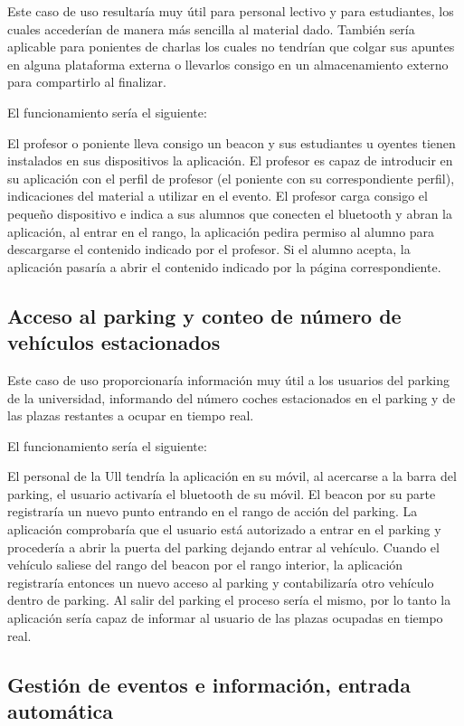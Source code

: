 Este caso de uso resultaría muy útil para personal lectivo y para estudiantes, los cuales accederían de manera más sencilla al material dado. También sería aplicable para ponientes de charlas los cuales no tendrían que colgar sus apuntes en alguna plataforma externa o llevarlos consigo en  un almacenamiento externo para compartirlo al finalizar.

El funcionamiento sería el siguiente: 

El profesor o poniente lleva consigo un beacon y sus estudiantes u oyentes tienen instalados en sus dispositivos la aplicación. El profesor es capaz de introducir en su aplicación con el perfil de profesor (el poniente con su correspondiente perfil), indicaciones del material a utilizar en el evento. El profesor carga consigo el pequeño dispositivo e indica a sus alumnos que conecten el bluetooth y abran la aplicación, al entrar en el rango, la aplicación pedira permiso al alumno para descargarse el contenido indicado por el profesor. Si el alumno acepta, la aplicación pasaría a abrir  el contenido indicado por la página correspondiente.


\subsection{Acceso al parking y conteo de número de vehículos estacionados}


Este caso de uso proporcionaría información muy útil a los usuarios del parking de la universidad, informando del número coches estacionados en el parking y de las plazas restantes a ocupar en tiempo real.

El funcionamiento sería el siguiente: 

El personal de la Ull tendría la aplicación en su móvil, al acercarse a la barra del parking, el usuario activaría el bluetooth de su móvil. El beacon por su parte registraría un nuevo punto entrando en el rango de acción del parking. La aplicación comprobaría que el usuario está autorizado a entrar en el parking y procedería a abrir la puerta del parking dejando entrar al vehículo. Cuando el vehículo saliese del rango del beacon por el rango interior, la aplicación registraría entonces un nuevo acceso al parking y contabilizaría otro vehículo dentro de parking. Al salir del parking el proceso sería el mismo, por lo tanto la aplicación sería capaz de informar al usuario de las plazas ocupadas en tiempo real.


\subsection{Gestión de eventos e información, entrada automática}

